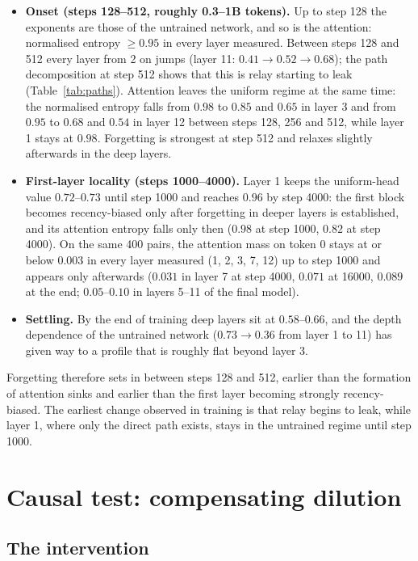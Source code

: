 \documentclass[11pt]{article}
\theoremstyle{definition}
\theoremstyle{remark}
\begin{document}
\begin{itemize}
  \item \textbf{Onset (steps 128--512, roughly 0.3--1B tokens).} Up to step 128 the exponents are those of the untrained network, and so is the attention: normalised entropy $\ge0.95$ in every layer measured. Between steps 128 and 512 every layer from 2 on jumps (layer 11: $0.41\to0.52\to0.68$); the path decomposition at step 512 shows that this is relay starting to leak (Table~\ref{tab:paths}). Attention leaves the uniform regime at the same time: the normalised entropy falls from $0.98$ to $0.85$ and $0.65$ in layer 3 and from $0.95$ to $0.68$ and $0.54$ in layer 12 between steps 128, 256 and 512, while layer 1 stays at $0.98$. Forgetting is strongest at step 512 and relaxes slightly afterwards in the deep layers.
  \item \textbf{First-layer locality (steps 1000--4000).} Layer 1 keeps the uniform-head value $0.72$--$0.73$ until step 1000 and reaches $0.96$ by step 4000: the first block becomes recency-biased only after forgetting in deeper layers is established, and its attention entropy falls only then ($0.98$ at step 1000, $0.82$ at step 4000). On the same 400 pairs, the attention mass on token 0 stays at or below $0.003$ in every layer measured (1, 2, 3, 7, 12) up to step 1000 and appears only afterwards ($0.031$ in layer 7 at step 4000, $0.071$ at 16000, $0.089$ at the end; $0.05$--$0.10$ in layers 5--11 of the final model).
  \item \textbf{Settling.} By the end of training deep layers sit at $0.58$--$0.66$, and the depth dependence of the untrained network ($0.73\to0.36$ from layer 1 to 11) has given way to a profile that is roughly flat beyond layer 3.
\end{itemize}

Forgetting therefore sets in between steps 128 and 512, earlier than the formation of attention sinks and earlier than the first layer becoming strongly recency-biased. The earliest change observed in training is that relay begins to leak, while layer 1, where only the direct path exists, stays in the untrained regime until step 1000.

\section{Causal test: compensating dilution}\label{sec:causal}
\subsection{The intervention}\label{sec:causal-setup}
\end{document}
